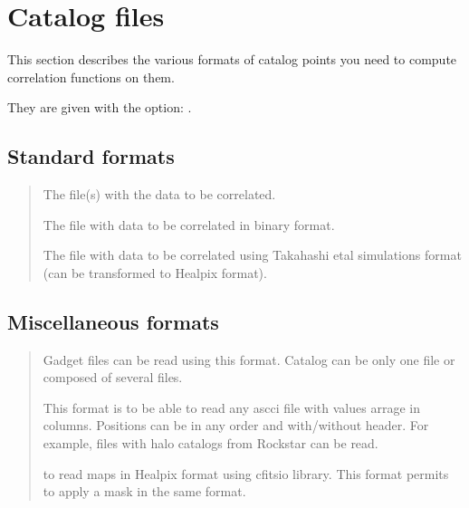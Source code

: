 \documentclass[letterpaper,10pt,english]{sphinxmanual}
\begin{document}
\sphinxstepscope


\chapter{Catalog files}
\label{\detokenize{catalog_files:catalog-files}}\label{\detokenize{catalog_files::doc}}
\sphinxAtStartPar
This section describes the various formats of catalog points you need to compute correlation functions on them.

\sphinxAtStartPar
They are given with the option: .


\section{Standard formats}
\label{\detokenize{catalog_files:standard-formats}}\begin{quote}\begin{description}
\sphinxAtStartPar
The file(s) with the data to be correlated.

\sphinxAtStartPar
The file with data to be correlated in binary format.

\sphinxAtStartPar
The file with data to be correlated using Takahashi etal simulations format (can be transformed to Healpix format).

\end{description}\end{quote}


\section{Miscellaneous formats}
\label{\detokenize{catalog_files:miscellaneous-formats}}\begin{quote}\begin{description}
\sphinxAtStartPar
Gadget files can be read using this format. Catalog can be only one file or composed of several files.

\sphinxAtStartPar
This format is to be able to read any ascci file with values arrage in columns. Positions can be in any order and with/without header. For example, files with halo catalogs from Rockstar can be read.

\sphinxAtStartPar
to read maps in Healpix format using cfitsio library. This format permits to apply a mask in the same format.

\end{description}\end{quote}
\end{document}
